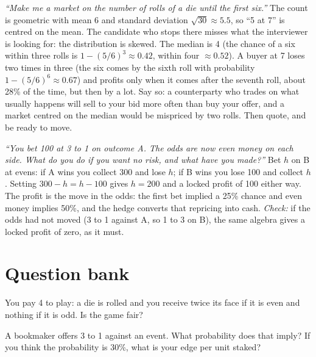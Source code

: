 \begin{example}\label{ex:iv:betting-and-market-making-games:geometric}
\emph{``Make me a market on the number of rolls of a die until the first six.''} The count is geometric with mean 6 and
standard deviation $\sqrt{30} \approx 5.5$, so ``5 at 7'' is centred on the mean. The candidate who stops there misses
what the interviewer is looking for: the distribution is skewed. The median is 4 (the chance of a six within three rolls
is $1 - (5/6)^3 \approx 0.42$, within four $\approx 0.52$). A buyer at 7 loses two times in three (the six comes by the
sixth roll with probability $1 - (5/6)^6 \approx 0.67$) and profits only when it comes after the seventh roll, about 28\%
of the time, but then by a lot. Say so: a counterparty who trades on what usually happens will sell to your bid more
often than buy your offer, and a market centred on the median would be mispriced by two rolls. Then quote, and be ready
to move.
\end{example}

\begin{example}\label{ex:iv:betting-and-market-making-games:lock}
\emph{``You bet 100 at 3 to 1 on outcome A. The odds are now even money on each side. What do you do if you want no risk,
and what have you made?''} Bet $h$ on B at evens: if A wins you collect 300 and lose $h$; if B wins you lose 100 and
collect $h$. Setting $300 - h = h - 100$ gives $h = 200$ and a locked profit of 100 either way. The profit is the move in
the odds: the first bet implied a 25\% chance and even money implies 50\%, and the hedge converts that repricing into
cash. \emph{Check:} if the odds had not moved (3 to 1 against A, so 1 to 3 on B), the same algebra gives a locked profit
of zero, as it must.
\end{example}

\section{Question bank}

\begin{interviewq}\label{iq:iv:betting-and-market-making-games:1}
You pay 4 to play: a die is rolled and you receive twice its face if it is even and nothing if it is odd. Is the
game fair?
\end{interviewq}

\begin{interviewq}\label{iq:iv:betting-and-market-making-games:2}
A bookmaker offers 3 to 1 against an event. What probability does that imply? If you think the probability is
30\%, what is your edge per unit staked?
\end{interviewq}

